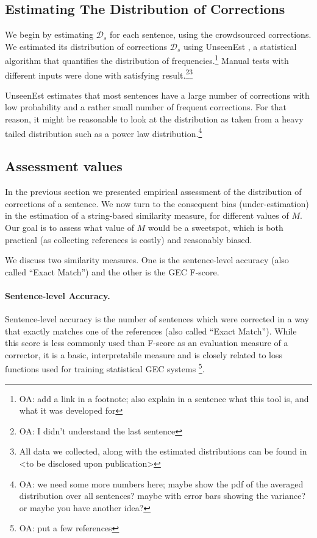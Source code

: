 \documentclass[english]{article}
\newcommand{\oa}[1]{\footnote{\color{red}OA: #1}}
\begin{document}
\subsection{Estimating The Distribution of Corrections}

We begin by estimating $\mathcal{D}_s$ for each sentence, using the crowdsourced
corrections. We estimated its distribution of corrections $\mathcal{D}_s$
using {\sc UnseenEst} \cite{zou2015quantifying}, a statistical algorithm that quantifies
the distribution of frequencies.\oa{add a link in a footnote; also explain in a sentence what
  this tool is, and what it was developed for} Manual tests with different inputs were done
with satisfying result.\oa{I didn't understand the last sentence}\footnote{All data
  we collected, along with the estimated distributions can be found in <to be disclosed
  upon publication>}

{\sc UnseenEst} estimates that most sentences have a large number of corrections with low probability and a rather small number of frequent corrections. For that reason, it might be reasonable to look at the distribution as taken from a heavy tailed distribution such as a power law distribution.\oa{we need some more numbers here; maybe show the pdf of the averaged distribution over all sentences? maybe with error bars showing the variance? or maybe you have another idea?}

\subsection{Assessment values}\label{subsec:Assessment-values}

In the previous section we presented empirical assessment of the distribution of
corrections of a sentence. We now turn to the consequent bias (under-estimation) in the estimation of a string-based similarity measure, for different values of $M$. Our goal is to assess what value of $M$ would be a sweetspot, which is both practical (as collecting references is costly) and reasonably biased.

We discuss two similarity measures. One is the sentence-level accuracy (also called ``Exact Match'') and the other is the GEC F-score.

 
\paragraph{Sentence-level Accuracy.}
Sentence-level accuracy is the number of sentences which were corrected in a way that exactly matches one of the
references (also called ``Exact Match''). While this score is less commonly used than F-score as an evaluation
measure of a corrector, it is a basic, interpretabile measure and is closely related to loss functions used for
training statistical GEC systems \cite{rozovskaya2010training,chodorow2012problems}\oa{put a few references}. 
\end{document}
